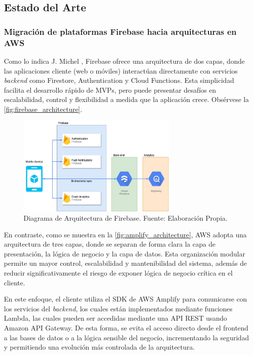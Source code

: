 \subsection{Estado del Arte}

\subsubsection{Migración de plataformas Firebase hacia arquitecturas en AWS}

Como lo indica J. Michel \cite{Michael2021}, Firebase ofrece una arquitectura de dos capas, donde las aplicaciones cliente (web o móviles) interactúan directamente con servicios \textit{backend} como Firestore, Authentication y Cloud Functions. Esta simplicidad facilita el desarrollo rápido de MVPs, pero puede presentar desafíos en escalabilidad, control y flexibilidad a medida que la aplicación crece. Obsérvese la \autoref{fig:firebase_architecture}.

\begin{figure}[H]
  \centering
  \includegraphics[width=0.7\textwidth]{img/figures/fig3-firebase-architecture.png}
  \caption{Diagrama de Arquitectura de Firebase. Fuente: Elaboración Propia.}
  \label{fig:firebase_architecture}
\end{figure}

En contraste, como se muestra en la \autoref{fig:amplify_architecture}, AWS adopta una arquitectura de tres capas, donde se separan de forma clara la capa de presentación, la lógica de negocio y la capa de datos. Esta organización modular permite un mayor control, escalabilidad y mantenibilidad del sistema, además de reducir significativamente el riesgo de exponer lógica de negocio crítica en el cliente.

En este enfoque, el cliente utiliza el SDK de AWS Amplify para comunicarse con los servicios del \textit{backend}, los cuales están implementados mediante funciones Lambda, las cuales pueden ser accedidas mediante una API REST usando Amazon API Gateway. De esta forma, se evita el acceso directo desde el frontend a las bases de datos o a la lógica sensible del negocio, incrementando la seguridad y permitiendo una evolución más controlada de la arquitectura.

